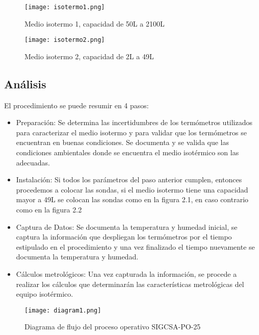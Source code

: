 \begin{figure}[H]
	\centering
	\texttt{[image: isotermo1.png]}
	\caption{Medio isotermo 1, capacidad de 50L a 2100L}
\end{figure}

\begin{figure}[H]
	\centering
	\texttt{[image: isotermo2.png]}
	\caption{Medio isotermo 2, capacidad de 2L a 49L}
\end{figure}
	
\subsection{Análisis}


\par \noindent
El procedimiento se puede resumir en 4 pasos:

\begin{itemize}
	\item Preparación: Se determina las incertidumbres de los termómetros utilizados para caracterizar el medio isotermo y para validar que los termómetros se encuentran en buenas condiciones. Se documenta y se valida que las condiciones ambientales donde se encuentra el medio isotérmico son las adecuadas.
	
	\item Instalación: Si todos los parámetros del paso anterior cumplen, entonces procedemos a colocar las sondas, si el medio isotermo tiene una capacidad mayor a 49L se colocan las sondas como en la figura 2.1, en caso contrario como en la figura 2.2
	
	\item Captura de Datos: Se documenta la temperatura y humedad inicial, se captura la información que despliegan los termómetros por el tiempo estipulado en el procedimiento y una vez finalizado el tiempo nuevamente se documenta la temperatura y humedad.
	
	\item Cálculos metrológicos: Una vez capturada la información, se procede a realizar los cálculos que determinarán las características metrológicas del equipo isotérmico. 
\end{itemize}

\begin{figure}[H]
	\centering
	\texttt{[image: diagram1.png]}
	\caption{Diagrama de flujo del proceso operativo SIGCSA-PO-25}
\end{figure}
